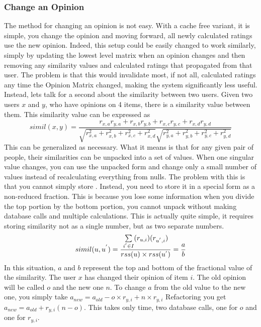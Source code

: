 \documentclass[12pt]{article}
\begin{document}
  \subsubsection{Change an Opinion}
  \label{Change an Opinion}
  \indent\indent  The method for changing an opinion is not easy.  With a cache free variant, it is simple, you change the opinion and moving forward, all newly calculated ratings use the new opinion.  Indeed, this setup could be easily changed to work similarly, simply by updating the lowest level matrix when an opinion changes and then removing any similarity values and calculated ratings that propagated from that user.  The problem is that this would invalidate most, if not all, calculated ratings any time the Opinion Matrix changed, making the system significantly less useful.
  \p Instead, lets talk for a second about the similarity between two users.  Given two users $x$ and $y$, who have opinions on 4 items, there is a similarity value between them.  This similarity value can be expressed as
  \begin{displaymath}
    simil(x, y) = \frac{r_{x, a}r_{y, a} + r_{x, b}r_{y, b} + r_{x, c}r_{y, c} + r_{x, d}r_{y, d}}{
      \sqrt{r_{x, a}^2+r_{x, b}^2+r_{x, c}^2+r_{x, d}^2}
      \sqrt{r_{y, a}^2+r_{y, b}^2+r_{y, c}^2+r_{y, d}^2}
    }
  \end{displaymath}
  \p This can be generalized as necessary.  What it means is that for any given pair of people, their similarities can be unpacked into a set of values.  When one singular value changes, you can use the unpacked form and change only a small number of values instead of recalculating everything from nulls.
  \p The problem with this is that you cannot simply store \similarity.  Instead, you need to store it in a special form as a non-reduced fraction.  This is because you lose some information when you divide the top portion by the bottom portion, you cannot unpack without making database calls and multiple calculations.  This is actually quite simple, it requires storing similarity not as a single number, but as two separate numbers.
  \begin{displaymath}
    simil(u, u^{'}) = \frac{\sum \limits_{i^{'} \in I} (r_{u, i}) (r_{u^{'}, i})}{rss(u) \times rss(u^{'})} = \frac{a}{b}
  \end{displaymath}
  \p In this situation, $a$ and $b$ represent the top and bottom of the fractional value of the similarity.  The user $x$ has changed their opinion of item $i$.  The old opinion will be called $o$ and the new one $n$.  To change $a$ from the old value to the new one, you simply take $a_{new} = a_{old} - o\times r_{y, i} + n\times r_{y, i}$  Refactoring you get $a_{new} = a_{old} + r_{y, i}(n - o)$.  This takes only  time, two database calls, one for $o$ and one for $r_{y, i}$.  
\end{document}
